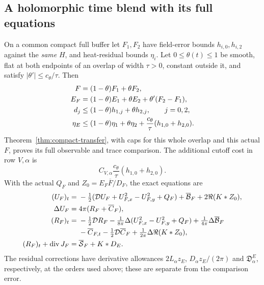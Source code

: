 \subsection{A holomorphic time blend with its full equations}
\begin{theorem}\label{thm:compact-time-join}
On a common compact full buffer let $F_1,F_2$ have field-error bounds
$h_{i,0},h_{i,2}$ against the \emph{same} $H$, and heat-residual bounds
$\eta_i$. Let $0\le\theta(t)\le1$ be smooth, flat at both endpoints
of an overlap of width $\tau>0$, constant outside it, and satisfy
$|\theta'|\le c_\theta/\tau$. Then
\begin{align}
 F&=(1-\theta)F_1+\theta F_2,\notag\\
 E_F&=(1-\theta)E_1+\theta E_2+\theta'(F_2-F_1),\notag\\
 d_j&\le(1-\theta)h_{1,j}+\theta h_{2,j},\qquad j=0,2,\notag\\
 \eta_E&\le(1-\theta)\eta_1+\theta\eta_2
            +\frac{c_\theta}{\tau}(h_{1,0}+h_{2,0}).
 \label{eq:cj-join}
\end{align}
Theorem~\ref{thm:compact-transfer}, with caps for this whole overlap and
this actual $F$, proves its full observable and trace comparison.
The additional cutoff cost in row $V,\alpha$ is
\begin{equation}
 C_{V,\alpha}\frac{c_\theta}{\tau}(h_{1,0}+h_{2,0}).
 \label{eq:cj-cutoff-cost}
\end{equation}
With the actual $Q_F$ and $Z_0=E_F\overline F/D_F$, the exact equations are
\begin{align}
 (U_F)_t={}&-\tfrac12(\mathcal D U_F+U_{F,x}^2-U_{F,y}^2+Q_F)
       +\overline{\mathcal B}_F+2\Re(K*Z_0),\notag\\
 \Delta U_F={}&4\pi(R_F+\overline C_F),\label{eq:cj-join-potential}\\
 (R_F)_t={}&-\tfrac12\mathcal D R_F
       -\tfrac1{8\pi}\Delta(U_{F,x}^2-U_{F,y}^2+Q_F)
       +\tfrac1{4\pi}\Delta\overline{\mathcal B}_F\notag\\
 &-\overline C_{F,t}-\tfrac12\mathcal D\overline C_F
       +\tfrac1{2\pi}\Delta\Re(K*Z_0),\notag\\
 (R_F)_t+\operatorname{div}J_F={}&\overline{\mathcal S}_F+K*D_E.
 \label{eq:cj-join-density}
\end{align}
The residual corrections have derivative allowances $2L_\alpha z_E$,
$D_\alpha z_E/(2\pi)$ and $\mathfrak D^E_\alpha$, respectively, at the
orders used above; these are separate from the comparison error.
\end{theorem}
